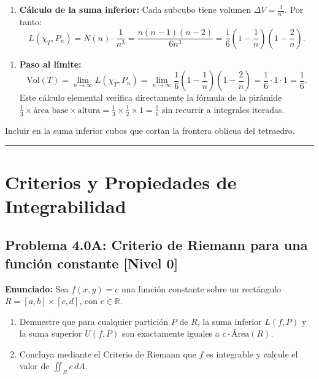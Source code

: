 \documentclass[11pt,a4paper]{article}
\begin{document}
\begin{enumerate}[label=\textbf{\arabic*.}]
\item \textbf{Cálculo de la suma inferior:}
Cada subcubo tiene volumen $\Delta V = \frac{1}{n^3}$. Por tanto:
\begin{equation*}
L(\chi_T, P_n) = N(n) \cdot \frac{1}{n^3} = \frac{n(n-1)(n-2)}{6 n^3} = \frac{1}{6} \left(1 - \frac{1}{n}\right)\left(1 - \frac{2}{n}\right).
\end{equation*}
\end{enumerate}

\begin{enumerate}[label=\textbf{\arabic*.}]
\item \textbf{Paso al límite:}
\begin{equation*}
\text{Vol}(T) = \lim_{n \to \infty} L(\chi_T, P_n) = \lim_{n \to \infty} \frac{1}{6} \left(1 - \frac{1}{n}\right)\left(1 - \frac{2}{n}\right) = \frac{1}{6} \cdot 1 \cdot 1 = \frac{1}{6}.
\end{equation*}
Este cálculo elemental verifica directamente la fórmula de la pirámide $\frac{1}{3} \times \text{área base} \times \text{altura} = \frac{1}{3} \times \frac{1}{2} \times 1 = \frac{1}{6}$ sin recurrir a integrales iteradas.
\end{enumerate}

\begin{trapbox}
Incluir en la suma inferior cubos que cortan la frontera oblicua del tetraedro.
\end{trapbox}

\vspace{0.5cm}
\hrule
\vspace{0.5cm}

\section{Criterios y Propiedades de Integrabilidad}

\subsection*{Problema 4.0A: Criterio de Riemann para una función constante \hfill \color{teal}\small[Nivel 0]}

\begin{tcolorbox}[colback=white,colframe=gray!40,arc=1mm,boxrule=0.5pt,left=3mm,right=3mm,top=2mm,bottom=2mm]
\textbf{Enunciado:} Sea $f(x,y) = c$ una función constante sobre un rectángulo $R = [a,b] \times [c,d]$, con $c \in \mathbb{R}$.
\begin{enumerate}[label=\textbf{\alph*)}]
\item Demuestre que para cualquier partición $P$ de $R$, la suma inferior $L(f,P)$ y la suma superior $U(f,P)$ son exactamente iguales a $c \cdot \text{Área}(R)$.
\item Concluya mediante el Criterio de Riemann que $f$ es integrable y calcule el valor de $\iint_R c \, dA$.
\end{enumerate}
\end{tcolorbox}
\end{document}
